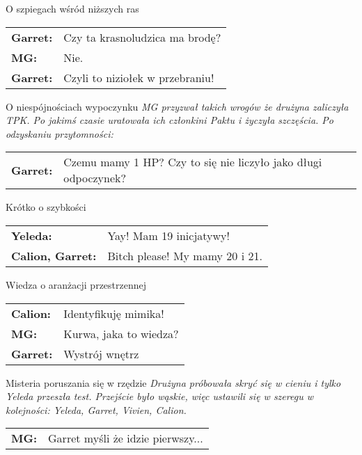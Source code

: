 \documentclass[10pt,twoside,twocolumn]{book}
\begin{document}
\begin{rpg-quotebox}{O szpiegach wśród niższych ras}
   \begin{tabularx}{\columnwidth}{lX}
      \textbf{Garret:} & Czy ta krasnoludzica ma brodę? \\
      \textbf{MG:}     & Nie. \\
      \textbf{Garret:} & Czyli to niziołek w przebraniu!
   \end{tabularx}
\end{rpg-quotebox}


\begin{rpg-quotebox}{O niespójnościach wypoczynku}
   \textit{MG przyzwał takich wrogów że drużyna zaliczyła TPK. Po jakimś czasie uratowała ich członkini Paktu i życzyła szczęścia. Po odzyskaniu przytomności:} \\

   \begin{tabularx}{\columnwidth}{lX}
      \textbf{Garret:} & Czemu mamy 1 HP? Czy to się nie liczyło jako długi odpoczynek?
   \end{tabularx}
\end{rpg-quotebox}


\begin{rpg-quotebox}{Krótko o szybkości}
   \begin{tabularx}{\columnwidth}{lX}
      \textbf{Yeleda:} & Yay! Mam 19 inicjatywy! \\
      \textbf{Calion, Garret:} & Bitch please! My mamy 20 i 21.
   \end{tabularx}
\end{rpg-quotebox}


\begin{rpg-quotebox}{Wiedza o aranżacji przestrzennej}
   \begin{tabularx}{\columnwidth}{lX}
      \textbf{Calion:} & Identyfikuję mimika! \\
      \textbf{MG:} & Kurwa, jaka to wiedza? \\
      \textbf{Garret:} & Wystrój wnętrz\\
   \end{tabularx}
\end{rpg-quotebox}


\begin{rpg-quotebox}{Misteria poruszania się w rzędzie}
   \textit{Drużyna próbowała skryć się w cieniu i tylko Yeleda przeszła test. Przejście było wąskie, więc ustawili się w szeregu w kolejności: Yeleda, Garret, Vivien, Calion.} \\

   \begin{tabularx}{\columnwidth}{lX}
      \textbf{MG:} & Garret myśli że idzie pierwszy... \\
   \end{tabularx}
\end{rpg-quotebox}
\end{document}
